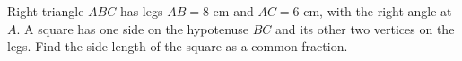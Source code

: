 Right triangle $ABC$ has legs $AB=8$ cm and $AC=6$ cm, with the right angle at $A$. A square has one side on the hypotenuse $BC$ and its other two vertices on the legs. Find the side length of the square as a common fraction.
